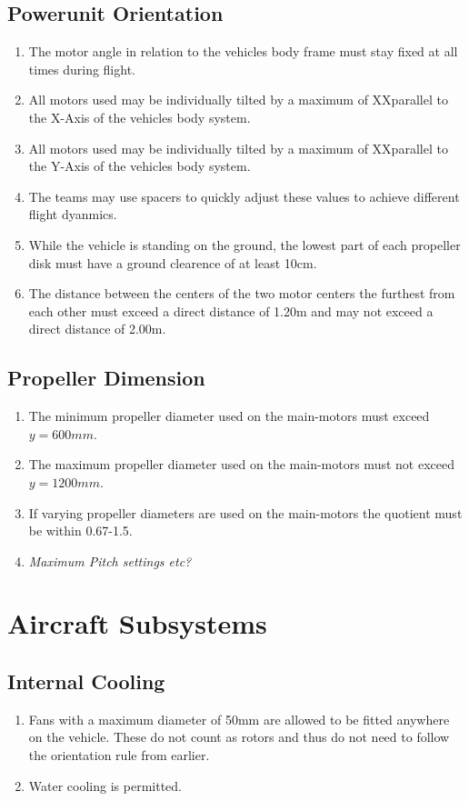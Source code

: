 \documentclass{article}
\begin{document}
\subsection{Powerunit Orientation}
\begin{enumerate}
  \item The motor angle in relation to the vehicles body frame must stay fixed at all times during flight. 
  \item All motors used may be individually tilted by a maximum of XX\degree  parallel to the X-Axis of the vehicles body system.
  \item All motors used may be individually tilted by a maximum of XX\degree  parallel to the Y-Axis of the vehicles body system.
  \item The teams may use spacers to quickly adjust these values to achieve different flight dyanmics.
  \item While the vehicle is standing on the ground, the lowest part of each propeller disk must have a ground clearence of at least 10cm. 
  \item The distance between the centers of the two motor centers the furthest from each other must exceed a direct distance of 1.20m and may not exceed a direct distance of 2.00m. 
\end{enumerate}


\subsection{Propeller Dimension}
\begin{enumerate}
  \item The minimum propeller diameter used on the main-motors must exceed $y=600mm$.
  \item The maximum propeller diameter used on the main-motors must not exceed $y=1200mm$.
  \item If varying propeller diameters are used on the main-motors the quotient must be within 0.67-1.5.
  \item \emph{Maximum Pitch settings etc?}
\end{enumerate}





\section{Aircraft Subsystems}

\subsection{Internal Cooling}
\begin{enumerate}
  \item Fans with a maximum diameter of 50mm are allowed to be fitted anywhere on the vehicle. These do not count as rotors and thus do not need to follow the orientation rule from earlier.
  \item Water cooling is permitted. 
\end{enumerate}
\end{document}
